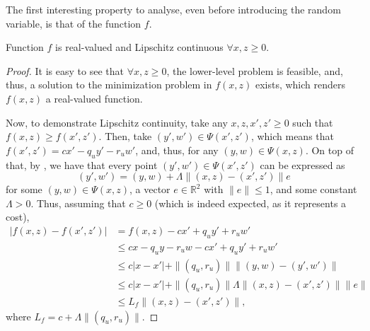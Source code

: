 \documentclass[12pt]{article}
\begin{document}
The first interesting property to analyse, even before introducing the random variable, is that of the function $f$.
\begin{lemma}\label{lemma:f-lip-cont}
    Function $f$ is real-valued and Lipschitz continuous $\forall x,z \ge 0$.
\end{lemma}
\begin{proof}
    It is easy to see that $\forall x,z \ge 0$, the lower-level problem is feasible, and, thus, a solution to the minimization problem in $f(x,z)$ exists, which renders $f(x,z)$ a real-valued function.

    Now, to demonstrate Lipschitz continuity, take any $x,z,x',z' \ge 0$ such that $f(x,z)\ge f(x',z')$.
    Then, take $(y',w') \in \Psi(x',z')$, which means that $f(x',z') = cx' - q_uy' -r_uw'$, and, thus, for any $(y,w) \in \Psi(x,z)$.
    On top of that, by \citet[Theorem~4.2]{klatteErrorBoundsSolutions1995}, we have that every point $(y',w')\in \Psi(x',z')$ can be expressed as \[
	(y',w') = (y,w) + \Lambda \| (x,z)-(x',z') \| e
    \] for some $(y,w) \in \Psi(x,z)$, a vector $e \in \mathbb{R}^{2}$ with $\|e\|\le 1$, and some constant $\Lambda > 0$.
    Thus, assuming that $c\ge 0$ (which is indeed expected, as it represents a cost),
    \begin{align*}
	|f(x,z)-f(x',z')| &= f(x,z) - cx' + q_uy' + r_uw' \\
			  &\le cx - q_u y - r_u w  - cx' + q_uy' + r_uw' \\
			  &\le  c |x-x'| + \|(q_u,r_u)\| \|(y,w)-(y',w')\| \\
			  &\le  c |x-x'| + \|(q_u,r_u)\| \Lambda \| (x,z)-(x',z') \| \|e\| \\
			  &\le  L_f \| (x,z)-(x',z') \|
    ,\end{align*}
    where $L_f = c + \Lambda \|(q_u,r_u)\|$.
\end{proof}
\end{document}
